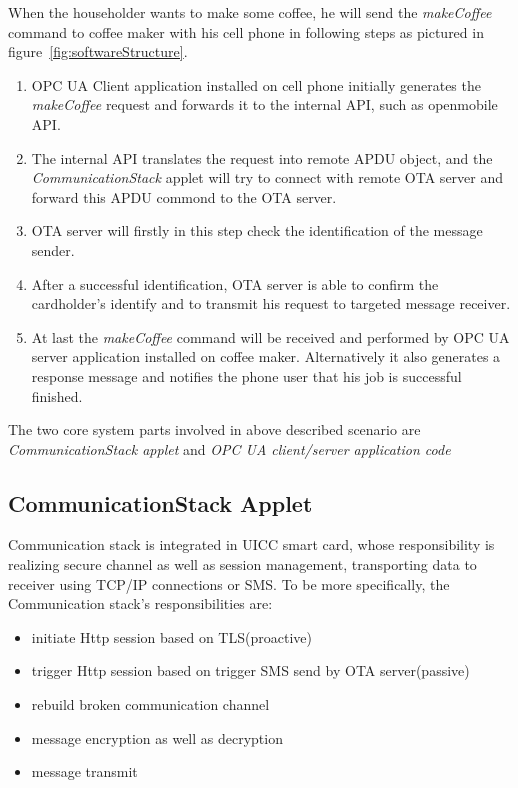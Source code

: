 When the householder wants to make some coffee, he will send the \emph{makeCoffee} command to coffee maker with his cell phone in following steps as pictured in figure~\ref{fig:softwareStructure}. 
\begin{enumerate}
\item OPC UA Client application installed on cell phone initially generates the \emph{makeCoffee} request and forwards it to the internal API, such as openmobile API.
\item The internal API translates the request into remote APDU object, and the \emph{CommunicationStack} applet will try to connect with remote OTA server and forward this APDU commond to the OTA server.
\item OTA server will firstly in this step check the identification of the message sender.
\item After a successful identification, OTA server is able to confirm the cardholder's identify and to transmit his request to targeted message receiver.
\item  At last the \emph{makeCoffee} command will be received and performed by OPC UA server application installed on coffee maker. Alternatively it also generates a response message and notifies the phone user that his job is successful  finished. 
\end{enumerate}
The two core system parts involved in above described scenario are \emph{CommunicationStack applet} and \emph{OPC UA client/server application code} 

\subsection{CommunicationStack Applet}
Communication stack is integrated in UICC smart card, whose responsibility is realizing secure channel as well as session management, transporting data to receiver using TCP/IP connections or SMS. To be more specifically, the Communication stack's responsibilities are:
\begin{itemize}
  \item initiate Http session based on TLS(proactive)
  \item trigger Http session based on trigger SMS send by OTA server(passive)
  \item rebuild broken communication channel
  \item message encryption as well as decryption
  \item message transmit
\end{itemize}

